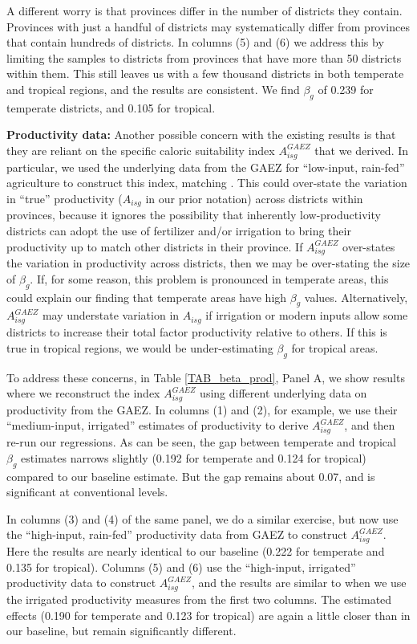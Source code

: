 \documentclass[11pt]{article}
\begin{document}
A different worry is that provinces differ in the number of districts they contain. Provinces with just a handful of districts may systematically differ from provinces that contain hundreds of districts. In columns (5) and (6) we address this by limiting the samples to districts from provinces that have more than 50 districts within them. This still leaves us with a few thousand districts in both temperate and tropical regions, and the results are consistent. We find $\beta_g$ of 0.239 for temperate districts, and 0.105 for tropical. 

\vspace{.5cm}\noindent\textbf{Productivity data:} Another possible concern with the existing results is that they are reliant on the specific caloric suitability index $A_{isg}^{GAEZ}$ that we derived. In particular, we used the underlying data from the GAEZ for ``low-input, rain-fed'' agriculture to construct this index, matching \cite{galorozak2016}. This could over-state the variation in ``true'' productivity ($A_{isg}$ in our prior notation) across districts within provinces, because it ignores the possibility that inherently low-productivity districts can adopt the use of fertilizer and/or irrigation to bring their productivity up to match other districts in their province. If $A_{isg}^{GAEZ}$ over-states the variation in productivity across districts, then we may be over-stating the size of $\beta_g$. If, for some reason, this problem is pronounced in temperate areas, this could explain our finding that temperate areas have high $\beta_g$ values. Alternatively, $A_{isg}^{GAEZ}$ may understate variation in $A_{isg}$ if irrigation or modern inputs allow some districts to increase their total factor productivity relative to others. If this is true in tropical regions, we would be under-estimating $\beta_g$ for tropical areas.

To address these concerns, in Table \ref{TAB_beta_prod}, Panel A, we show results where we reconstruct the index $A_{isg}^{GAEZ}$ using different underlying data on productivity from the GAEZ. In columns (1) and (2), for example, we use their ``medium-input, irrigated'' estimates of productivity to derive $A_{isg}^{GAEZ}$, and then re-run our regressions. As can be seen, the gap between temperate and tropical $\beta_g$ estimates narrows slightly (0.192 for temperate and 0.124 for tropical) compared to our baseline estimate. But the gap remains about 0.07, and is significant at conventional levels.

In columns (3) and (4) of the same panel, we do a similar exercise, but now use the ``high-input, rain-fed'' productivity data from GAEZ to construct $A_{isg}^{GAEZ}$. Here the results are nearly identical to our baseline (0.222 for temperate and 0.135 for tropical). Columns (5) and (6) use the ``high-input, irrigated'' productivity data to construct $A_{isg}^{GAEZ}$, and the results are similar to when we use the irrigated productivity measures from the first two columns. The estimated effects (0.190 for temperate and 0.123 for tropical) are again a little closer than in our baseline, but remain significantly different.
\end{document}
